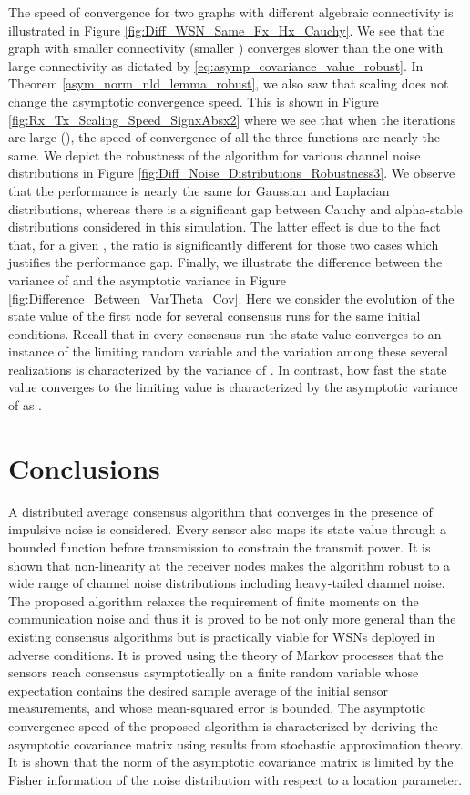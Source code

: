\documentclass[onecolumn, draft, 12pt]{IEEEtran}
\begin{document}
The speed of convergence for two graphs with different algebraic connectivity is illustrated in Figure \ref{fig:Diff_WSN_Same_Fx_Hx_Cauchy}. We see that the graph with smaller connectivity (smaller ) converges slower than the one with large connectivity as dictated by  \eqref{eq:asymp_covariance_value_robust}. In Theorem \ref{asym_norm_nld_lemma_robust}, we also saw that scaling  does not change the asymptotic convergence speed. This is shown in Figure \ref{fig:Rx_Tx_Scaling_Speed_SignxAbsx2} where we see that when the iterations are large (), the speed of convergence of all the three functions are nearly the same. We depict the robustness of the  algorithm for various channel noise distributions in Figure \ref{fig:Diff_Noise_Distributions_Robustness3}. We observe that the performance is nearly the same for Gaussian and Laplacian distributions, whereas there is a significant gap between Cauchy and alpha-stable distributions considered in this simulation. The latter effect is due to the fact that, for a given , the ratio  is significantly different for those two cases which justifies the performance gap. Finally, we illustrate the difference between the variance of  and the asymptotic variance in Figure \ref{fig:Difference_Between_VarTheta_Cov}. Here we consider the evolution of the state value  of the first node for several consensus runs for the same initial conditions. Recall that in every consensus run the state value  converges to an instance of the limiting random variable  and the variation among these several realizations is characterized by the variance of . In contrast, how fast the state value  converges to the limiting value  is characterized by the asymptotic variance of  as .

\section{Conclusions} \label{Sec:Conclusions:consensus_robust}
A distributed average consensus algorithm that converges in the presence of impulsive noise is considered. Every sensor also maps its state value through a bounded function before transmission to constrain the transmit power. It is shown that non-linearity at the receiver nodes makes the algorithm robust to a wide range of channel noise distributions including heavy-tailed channel noise. The proposed algorithm relaxes the requirement of finite moments on the communication noise and thus it is proved to be not only more general than the existing consensus algorithms but is practically viable for WSNs deployed in adverse conditions. It is proved using the theory of Markov processes that the sensors reach consensus asymptotically on a finite random variable whose expectation contains the desired sample average of the initial sensor measurements, and whose mean-squared error is bounded. The asymptotic convergence speed of the proposed algorithm is characterized by deriving the asymptotic covariance matrix using results from stochastic approximation theory. It is shown that the norm of the asymptotic covariance matrix is limited by the Fisher information of the noise distribution with respect to a location parameter.
\end{document}

